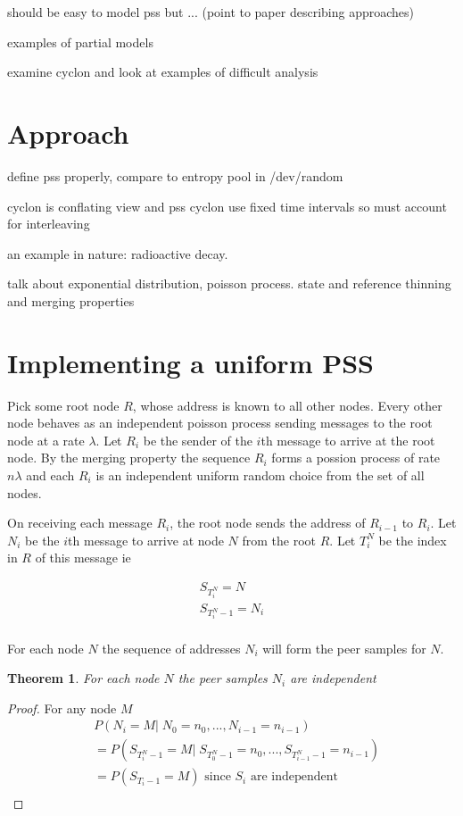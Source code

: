 \documentclass[a4paper,10pt]{article}
\newtheorem*{thm}{Theorem}
\begin{document}
should be easy to model pss but ... (point to paper describing approaches)

examples of partial models

examine cyclon \cite{cyclon} and look at examples of difficult analysis

\section{Approach}

define pss properly, compare to entropy pool in /dev/random

cyclon is conflating view and pss
cyclon use fixed time intervals so must account for interleaving

an example in nature: radioactive decay.

talk about exponential distribution, poisson process. state and reference thinning and merging properties

\section{Implementing a uniform PSS}

Pick some root node $R$, whose address is known to all other nodes. Every other node behaves as an independent poisson process sending messages to the root node at a rate $\lambda$. Let $R_i$ be the sender of the $i$th message to arrive at the root node. By the merging property the sequence $R_i$ forms a possion process of rate $n \lambda$ and each $R_i$ is an independent uniform random choice from the set of all nodes.

On receiving each message $R_i$, the root node sends the address of $R_{i-1}$ to $R_i$. Let $N_i$ be the $i$th message to arrive at node $N$ from the root $R$. Let $T^N_i$ be the index in $R$ of this message ie

\begin{gather*}
S_{T^N_i} = N \\
S_{T^N_i-1} = N_i \\
\end{gather*}

For each node $N$ the sequence of addresses $N_i$ will form the peer samples for $N$.

\begin{thm}For each node $N$ the peer samples $N_i$ are independent\end{thm}

\begin{proof}
For any node $M$
\begin{align*}
& \!\!\! P(N_i = M |\; N_0=n_0, ... ,N_{i-1} = n_{i-1}) \\
& = P(S_{T^N_i-1} = M |\; S_{T^N_0-1} = n_0, ... ,S_{T^N_{i-1}-1} = n_{i-1}) \\
& = P(S_{T_i-1} = M) \text{ since $S_i$ are independent} \\
\end{align*}
\end{proof}
\end{document}
